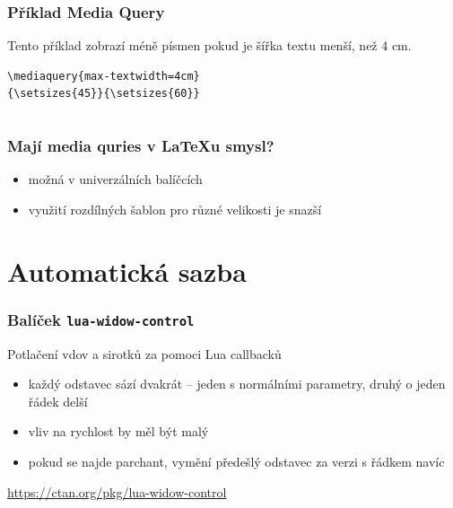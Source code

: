 \begin{frame}[fragile]

  \frametitle{Příklad Media Query}

  Tento příklad zobrazí méně písmen pokud je šířka textu menší, než 4 cm.

  
\begin{verbatim}
\mediaquery{max-textwidth=4cm}
{\setsizes{45}}{\setsizes{60}}
\end{verbatim}
\begin{columns}
  \begin{column}{0.5\textwidth}
\end{column}
  \begin{column}{0.5\textwidth}
\end{column}
\end{columns}

\end{frame}

\begin{frame}
  \frametitle{Mají media quries v \LaTeX u smysl?}
  \begin{itemize}
    \item možná v univerzálních balíčcích
    \item využití rozdílných šablon pro různé velikosti je snazší
  \end{itemize}
\end{frame}


\section{Automatická sazba}

\begin{frame}
  \frametitle{Balíček \texttt{lua-widow-control}}
  Potlačení vdov a sirotků za pomoci Lua callbacků
  \begin{itemize}
    \item každý odstavec sází dvakrát -- jeden s normálními parametry, druhý o jeden řádek delší
    \item vliv na rychlost by měl být malý
    
    \item pokud se najde parchant, vymění předešlý odstavec za verzi s řádkem navíc
  \end{itemize}
  \url{https://ctan.org/pkg/lua-widow-control}
\end{frame}

